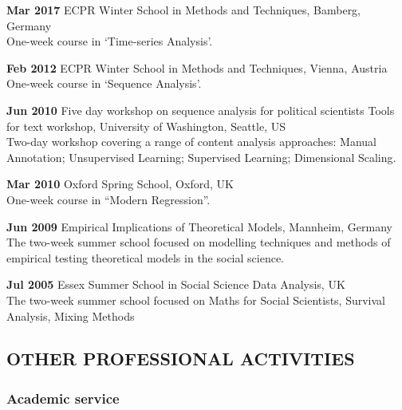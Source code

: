 \documentclass[11pt,]{article}
\renewenvironment{itemize}{
  \begin{list}{}{
    \setlength{\leftmargin}{1.5em}
  }
}{
  \end{list}
}
\begin{document}
\begin{itemize}
\item
  \textbf{Mar 2017} ECPR Winter School in Methods and Techniques,
  Bamberg, Germany\\
  One-week course in `Time-series Analysis'.
\item
  \textbf{Feb 2012} ECPR Winter School in Methods and Techniques,
  Vienna, Austria\\
  One-week course in `Sequence Analysis'.
\item
  \textbf{Jun 2010} Five day workshop on sequence analysis for political
  scientists Tools for text workshop, University of Washington, Seattle,
  US\\
  Two-day workshop covering a range of content analysis approaches:
  Manual Annotation; Unsupervised Learning; Supervised Learning;
  Dimensional Scaling.
\item
  \textbf{Mar 2010} Oxford Spring School, Oxford, UK\\
  One-week course in ``Modern Regression''.
\item
  \textbf{Jun 2009} Empirical Implications of Theoretical Models,
  Mannheim, Germany\\
  The two-week summer school focused on modelling techniques and methods
  of empirical testing theoretical models in the social science.
\item
  \textbf{Jul 2005} Essex Summer School in Social Science Data Analysis,
  UK\\
  The two-week summer school focused on Maths for Social Scientists,
  Survival Analysis, Mixing Methods
\end{itemize}

\hypertarget{other-professional-activities}{%
\subsection{OTHER PROFESSIONAL
ACTIVITIES}\label{other-professional-activities}}

\hypertarget{academic-service}{%
\subsubsection{Academic service}\label{academic-service}}
\end{document}
